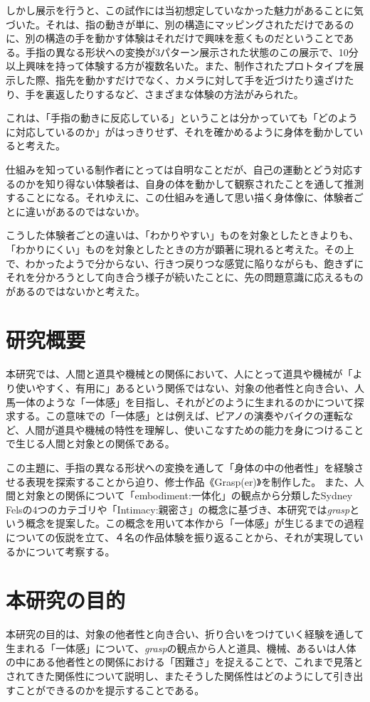 しかし展示を行うと、この試作には当初想定していなかった魅力があることに気づいた。それは、指の動きが単に、別の構造にマッピングされただけであるのに、別の構造の手を動かす体験はそれだけで興味を惹くものだということである。手指の異なる形状への変換が3パターン展示された状態のこの展示で、10分以上興味を持って体験する方が複数名いた。また、制作されたプロトタイプを展示した際、指先を動かすだけでなく、カメラに対して手を近づけたり遠ざけたり、手を裏返したりするなど、さまざまな体験の方法がみられた。

これは、「手指の動きに反応している」ということは分かっていても「どのように対応しているのか」がはっきりせず、それを確かめるように身体を動かしていると考えた。

仕組みを知っている制作者にとっては自明なことだが、自己の運動とどう対応するのかを知り得ない体験者は、自身の体を動かして観察されたことを通して推測することになる。それゆえに、この仕組みを通して思い描く身体像に、体験者ごとに違いがあるのではないか。

こうした体験者ごとの違いは、「わかりやすい」ものを対象としたときよりも、「わかりにくい」ものを対象としたときの方が顕著に現れると考えた。その上で、わかったようで分からない、行きつ戻りつな感覚に陥りながらも、飽きずにそれを分かろうとして向き合う様子が続いたことに、先の問題意識に応えるものがあるのではないかと考えた。


\section{研究概要}
本研究では、人間と道具や機械との関係において、人にとって道具や機械が「より使いやすく、有用に」あるという関係ではない、対象の他者性と向き合い、人馬一体のような「一体感」を目指し、それがどのように生まれるのかについて探求する。この意味での「一体感」とは例えば、ピアノの演奏やバイクの運転など、人間が道具や機械の特性を理解し、使いこなすための能力を身につけることで生じる人間と対象との関係である。

この主題に、手指の異なる形状への変換を通して「身体の中の他者性」を経験させる表現を探索することから迫り、修士作品《Grasp(er)》を制作した。
また、人間と対象との関係について「embodiment:一体化」の観点から分類したSydney Felsの4つのカテゴリや「Intimacy:親密さ」の概念に基づき、本研究では\textit{grasp}という概念を提案した。この概念を用いて本作から「一体感」が生じるまでの過程についての仮説を立て、４名の作品体験を振り返ることから、それが実現しているかについて考察する。

\section{本研究の目的}
本研究の目的は、対象の他者性と向き合い、折り合いをつけていく経験を通して生まれる「一体感」について、\textit{grasp}の観点から人と道具、機械、あるいは人体の中にある他者性との関係における「困難さ」を捉えることで、これまで見落とされてきた関係性について説明し、またそうした関係性はどのようにして引き出すことができるのかを提示することである。

